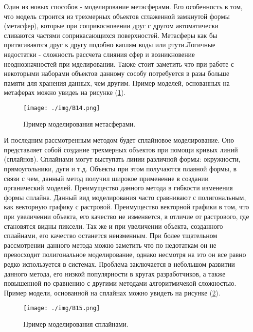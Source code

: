 Один из новых способов - моделирование метасферами. Его особенность в том, что модель строится из трехмерных объектов сглаженной замкнутой формы (метасфер), которые при соприкосновении друг с другом автоматически сливаются частями соприкасающихся поверхностей. Метасферы как бы притягиваются друг к другу подобно каплям воды или ртути.Логичные недостатки - сложность рассчета слияния сфер и возникновение неоднозначностей при мделировании. Также стоит заметить что при работе с некоторыми наборами объектов данному сособу потребуется в разы больше памяти для хранения данных, чем другим. Пример моделей, основанных на метаферах можно увидеь на рисунке (\ref{pic:B14}).

\begin{figure} 
\begin{center}
\texttt{[image: ./img/B14.png]}
\end{center}
\caption{Пример моделирования метасферами.}
\label{pic:B14}
\end{figure}

И последним рассмотренным методом будет сплайновое моделирование. Оно представляет собой создание трехмерных объектов при помощи кривых линий (сплайнов). Сплайнами могут выступать линии различной формы: окружности, прямоугольники, дуги и т.д. Объекты при этом получаются плавной формы, в связи с чем, данный метод получил широкое применение в создании органический моделей. Преимущество данного метода в гибкости изменения формы сплайна. Данный вид моделирования часто сравнивают с полигональным, как векторную графику с растровой. Преимущество векторной графики в том, что при увеличении объекта, его качество не изменяется, в отличие от растрового, где становятся видны пиксели. Так же и при увеличении объекта, созданного сплайнами, его качество останется неизменным. При более тщательном рассмотрении данного метода можно заметить что по недотаткам он не превосходит полигональное моделирование, однако несмотря на это он все равно редко используется в системах. Проблема заключается в небольшом развитии данного метода, его низкой популярности в кругах разработчиков, а также повышенной по сравнению с другими методами алгоритмичекой сложностью. Пример модели, основанной на сплайнах можно увидеть на рисунке (\ref{pic:B15}).

\begin{figure} 
\begin{center}
\texttt{[image: ./img/B15.png]}
\end{center}
\caption{Пример моделирования сплайнами.}
\label{pic:B15}
\end{figure}

